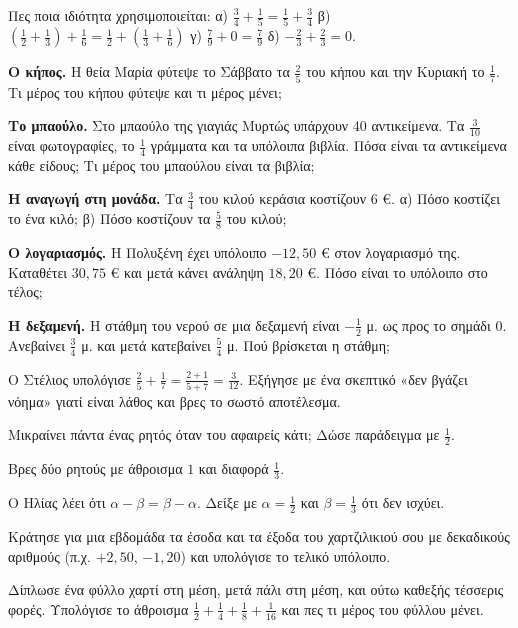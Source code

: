 \ex Πες ποια ιδιότητα χρησιμοποιείται: α) $\frac{3}{4}+\frac{1}{5}=\frac{1}{5}+\frac{3}{4}$ \quad β) $\left(\frac{1}{2}+\frac{1}{3}\right)+\frac{1}{6}=\frac{1}{2}+\left(\frac{1}{3}+\frac{1}{6}\right)$ \quad γ) $\frac{7}{9}+0=\frac{7}{9}$ \quad δ) $-\frac{2}{3}+\frac{2}{3}=0$.


\ex \textbf{Ο κήπος.} Η θεία Μαρία φύτεψε το Σάββατο τα $\frac{2}{5}$ του κήπου και την Κυριακή το $\frac{1}{7}$. Τι μέρος του κήπου φύτεψε και τι μέρος μένει;

\ex \textbf{Το μπαούλο.} Στο μπαούλο της γιαγιάς Μυρτώς υπάρχουν $40$ αντικείμενα. Τα $\frac{3}{10}$ είναι φωτογραφίες, το $\frac{1}{4}$ γράμματα και τα υπόλοιπα βιβλία. Πόσα είναι τα αντικείμενα κάθε είδους; Τι μέρος του μπαούλου είναι τα βιβλία;

\ex \textbf{Η αναγωγή στη μονάδα.} Τα $\frac{3}{4}$ του κιλού κεράσια κοστίζουν $6$ €. α) Πόσο κοστίζει το ένα κιλό; β) Πόσο κοστίζουν τα $\frac{5}{8}$ του κιλού;

\ex \textbf{Ο λογαριασμός.} Η Πολυξένη έχει υπόλοιπο $-12{,}50$ € στον λογαριασμό της. Καταθέτει $30{,}75$ € και μετά κάνει ανάληψη $18{,}20$ €. Πόσο είναι το υπόλοιπο στο τέλος;

\ex \textbf{Η δεξαμενή.} Η στάθμη του νερού σε μια δεξαμενή είναι $-\frac{1}{2}$ μ. ως προς το σημάδι $0$. Ανεβαίνει $\frac{3}{4}$ μ. και μετά κατεβαίνει $\frac{5}{4}$ μ. Πού βρίσκεται η στάθμη;


\ex Ο Στέλιος υπολόγισε $\frac{2}{5}+\frac{1}{7}=\frac{2+1}{5+7}=\frac{3}{12}$. Εξήγησε με ένα σκεπτικό «δεν βγάζει νόημα» γιατί είναι λάθος και βρες το σωστό αποτέλεσμα.

\ex Μικραίνει πάντα ένας ρητός όταν του αφαιρείς κάτι; Δώσε παράδειγμα με $\frac{1}{2}$.

\ex Βρες δύο ρητούς με άθροισμα $1$ και διαφορά $\frac{1}{3}$.

\ex Ο Ηλίας λέει ότι $\alpha-\beta=\beta-\alpha$. Δείξε με $\alpha=\frac{1}{2}$ και $\beta=\frac{1}{3}$ ότι δεν ισχύει.


\ex Κράτησε για μια εβδομάδα τα έσοδα και τα έξοδα του χαρτζιλικιού σου με δεκαδικούς αριθμούς (π.χ. $+2{,}50$, $-1{,}20$) και υπολόγισε το τελικό υπόλοιπο.

\ex Δίπλωσε ένα φύλλο χαρτί στη μέση, μετά πάλι στη μέση, και ούτω καθεξής τέσσερις φορές. Υπολόγισε το άθροισμα $\frac{1}{2}+\frac{1}{4}+\frac{1}{8}+\frac{1}{16}$ και πες τι μέρος του φύλλου μένει.
